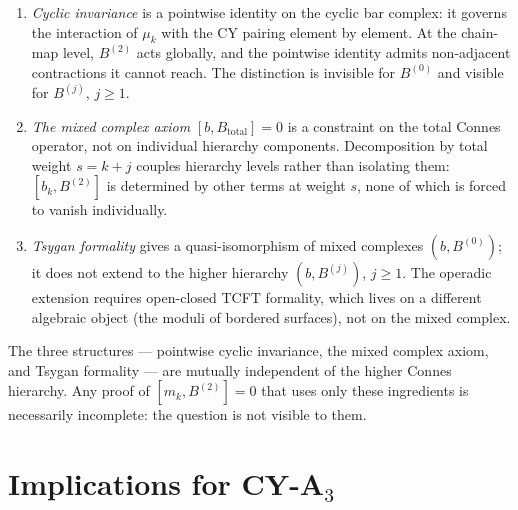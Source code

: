 \begin{enumerate}[label=\textup{(\roman*)}]
 \item \emph{Cyclic invariance} is a pointwise identity on the
  cyclic bar complex: it governs the interaction of $\mu_k$ with
  the CY pairing element by element.  At the chain-map level,
  $B^{(2)}$ acts globally, and the pointwise identity admits
  non-adjacent contractions it cannot reach.  The distinction is
  invisible for $B^{(0)}$ and visible for $B^{(j)}$, $j \geq 1$.
 \item \emph{The mixed complex axiom} $[b, B_{\mathrm{total}}] = 0$
  is a constraint on the total Connes operator, not on individual
  hierarchy components.  Decomposition by total weight
  $s = k + j$ couples hierarchy levels rather than isolating them:
  $[b_k, B^{(2)}]$ is determined by other terms at weight $s$,
  none of which is forced to vanish individually.
 \item \emph{Tsygan formality} gives a quasi-isomorphism of mixed
  complexes $(b, B^{(0)})$; it does not extend to the higher
  hierarchy $(b, B^{(j)})$, $j \geq 1$.  The operadic extension
  requires open-closed TCFT formality, which lives on a different
  algebraic object (the moduli of bordered surfaces), not on the
  mixed complex.
\end{enumerate}

The three structures --- pointwise cyclic invariance, the mixed
complex axiom, and Tsygan formality --- are mutually independent
of the higher Connes hierarchy.  Any proof of
$[m_k, B^{(2)}] = 0$ that uses only these ingredients is
necessarily incomplete: the question is not visible to them.


\section{Implications for CY-A$_3$}
\label{sec:m3b2-implications}

